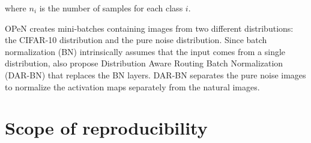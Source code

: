 where $n_i$ is the number of samples for each class $i$.

OPeN creates mini-batches containing images from two different distributions: the CIFAR-10 distribution and the pure noise distribution. Since batch normalization (BN) \citep{BatchNorm} intrinsically assumes that the input comes from a single distribution, \citet{PureNoise} also propose Distribution Aware Routing Batch Normalization (DAR-BN) that replaces the BN layers. DAR-BN separates the pure noise images to normalize the activation maps separately from the natural images.





\section{Scope of reproducibility}
\label{sec:claims}



